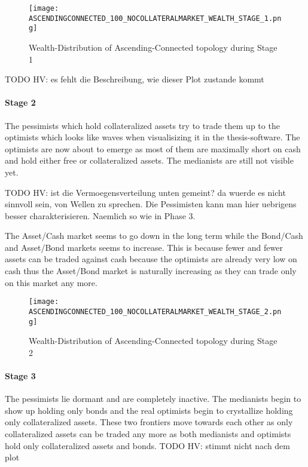 \documentclass[Bachelorarbeit.tex]{subfiles}
\begin{document}
\begin{figure}[H]
	\centering
  \texttt{[image: ASCENDINGCONNECTED\_100\_NOCOLLATERALMARKET\_WEALTH\_STAGE\_1.png]}
  	\caption{Wealth-Distribution of Ascending-Connected topology during Stage 1}
	\label{fig:markets_ASCENDINGCONNECTED_100_NOCOLLATERALMARKET_WEALTH_STAGE_1}
\end{figure}

TODO HV: es fehlt die Beschreibung, wie dieser Plot zustande kommt

\paragraph{Stage 2}
The pessimists which hold collateralized assets try to trade them up to the optimists which looks like waves when visualisizing it in the thesis-software. The optimists are now about to emerge as most of them are maximally short on cash and hold either free or collateralized assets. The medianists are still not visible yet.

TODO HV: ist die Vermoegensverteilung unten gemeint? da wuerde es nicht sinnvoll sein, von Wellen zu sprechen. Die Pessimisten kann man hier uebrigens besser charakterisieren. Naemlich so wie in Phase 3.

\medskip
		
The Asset/Cash market seems to go down in the long term while the Bond/Cash and Asset/Bond markets seems to increase. This is because fewer and fewer assets can be traded against cash because the optimists are already very low on cash thus the Asset/Bond market is naturally increasing as they can trade only on this market any more.
		
\begin{figure}[H]
	\centering
  \texttt{[image: ASCENDINGCONNECTED\_100\_NOCOLLATERALMARKET\_WEALTH\_STAGE\_2.png]}
  	\caption{Wealth-Distribution of Ascending-Connected topology during Stage 2}
	\label{fig:markets_ASCENDINGCONNECTED_100_NOCOLLATERALMARKET_WEALTH_STAGE_2}
\end{figure}
		
\paragraph{Stage 3}
The pessimists lie dormant and are completely inactive. The medianists begin to show up holding only bonds and the real optimists begin to crystallize holding only collateralized assets. These two frontiers move towards each other as only collateralized assets can be traded any more as both medianists and optimists hold only collateralized assets and bonds. TODO HV: stimmt nicht nach dem plot
\end{document}
